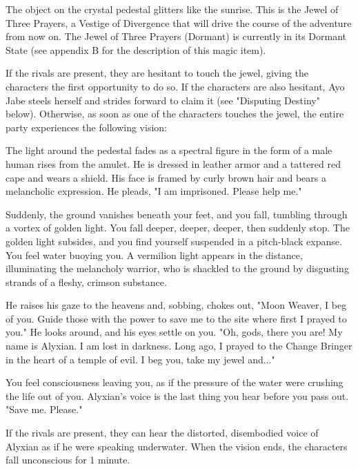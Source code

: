 \documentclass[10pt,a4paper,twoside,bg=print,twocolumn,openany,nodeprecatedcode]{dndbook}
\begin{document}
The object on the crystal pedestal glitters like the sunrise. This is the Jewel of Three Prayers, a Vestige of Divergence that will drive the course of the adventure from now on. The Jewel of Three Prayers (Dormant) is currently in its Dormant State (see appendix B for the description of this magic item).

If the rivals are present, they are hesitant to touch the jewel, giving the characters the first opportunity to do so. If the characters are also hesitant, Ayo Jabe steels herself and strides forward to claim it (see "Disputing Destiny" below). Otherwise, as soon as one of the characters touches the jewel, the entire party experiences the following vision:

\begin{DndReadAloud}{}
The light around the pedestal fades as a spectral figure in the form of a male human rises from the amulet. He is dressed in leather armor and a tattered red cape and wears a shield. His face is framed by curly brown hair and bears a melancholic expression. He pleads, "I am imprisoned. Please help me."

Suddenly, the ground vanishes beneath your feet, and you fall, tumbling through a vortex of golden light. You fall deeper, deeper, deeper, then suddenly stop. The golden light subsides, and you find yourself suspended in a pitch-black expanse. You feel water buoying you. A vermilion light appears in the distance, illuminating the melancholy warrior, who is shackled to the ground by disgusting strands of a fleshy, crimson substance.

He raises his gaze to the heavens and, sobbing, chokes out, "Moon Weaver, I beg of you. Guide those with the power to save me to the site where first I prayed to you." He looks around, and his eyes settle on you. "Oh, gods, there you are! My name is Alyxian. I am lost in darkness. Long ago, I prayed to the Change Bringer in the heart of a temple of evil. I beg you, take my jewel and..."

You feel consciousness leaving you, as if the pressure of the water were crushing the life out of you. Alyxian's voice is the last thing you hear before you pass out. "Save me. Please."

\end{DndReadAloud}

If the rivals are present, they can hear the distorted, disembodied voice of Alyxian as if he were speaking underwater. When the vision ends, the characters fall unconscious for 1 minute.
\end{document}
